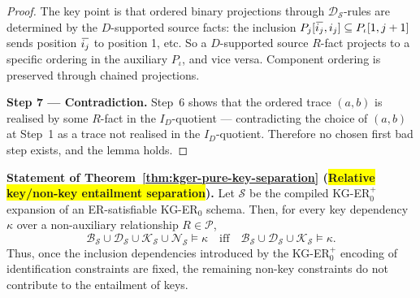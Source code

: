 \documentclass[10pt]{article}
\newcommand{\ols}[1]{\mskip.5\thinmuskip\overline{\mskip-.5\thinmuskip {#1} \mskip-.5\thinmuskip}\mskip.5\thinmuskip} %
\begin{document}
\begin{proof}
The key point is that ordered binary projections through
\(\mathcal D_{\mathcal S}\)-rules are determined by the
\(D\)-supported source facts: the inclusion
\(P_j[\ols{i_j},i_j]\subseteq P_\iota[1,j+1]\) sends position
\(\ols{i_j}\) to position 1, etc.  So a \(D\)-supported source
\(R\)-fact projects to a specific ordering in the auxiliary \(P_\iota\),
and vice versa.  Component ordering is preserved through chained
projections.

\smallskip\noindent\textbf{Step 7 --- Contradiction.}
Step~6 shows that the ordered trace \((a,b)\) is realised by some
\(R\)-fact in the \(I_D\)-quotient --- contradicting the choice of
\((a,b)\) at Step~1 as a trace not realised in the \(I_D\)-quotient.
Therefore no chosen first bad step exists, and the lemma holds.
\end{proof}

\noindent\textbf{Statement of Theorem~\ref{thm:kger-pure-key-separation} (\colorbox{yellow}{Relative key/non-key entailment separation}).}
Let \(\mathcal S\) be the compiled KG-ER\(_0^+\) expansion of an
ER-satisfiable KG-ER\(_0\) schema.  Then, for every key dependency
\(\kappa\) over a non-auxiliary
relationship \(R\in\mathcal P\),
\[
\mathcal B_{\mathcal S}\cup\mathcal D_{\mathcal S}\cup
\mathcal K_{\mathcal S}\cup\mathcal N_{\mathcal S}\models\kappa
\quad\text{iff}\quad
\mathcal B_{\mathcal S}\cup\mathcal D_{\mathcal S}\cup
\mathcal K_{\mathcal S}\models\kappa .
\]
Thus, once the inclusion dependencies introduced by the KG-ER\(_0^+\)
encoding of identification constraints are fixed, the remaining non-key
constraints do not contribute to the entailment of keys.
\end{document}
